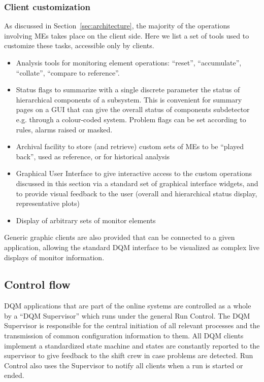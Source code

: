 \documentclass[a4paper]{cmspaper}
\begin{document}
\subsubsection{Client customization}
\label{sec:dqm:tools}
%
As discussed in Section~\ref{sec:architecture}, the majority of the operations
involving MEs takes place on the client side. Here we list
a set of tools used to customize these tasks, accessible only by
clients.
\begin{itemize}
\item{Analysis tools for monitoring element operations:
``reset'', ``accumulate'', ``collate'', ``compare to reference''.}
\item{Status flags to summarize with a single discrete parameter the status of hierarchical
components of a subsystem. This is convenient for
summary pages on a GUI that can give the overall status of components
subdetector e.g. through a colour-coded system. Problem flags
can be set according to rules, alarms raised or masked.}
%
\item{Archival facility to store (and retrieve) custom sets of MEs to be
``played back'', used as reference, or for historical analysis}
%
\item{Graphical User Interface to give interactive access to
the custom operations discussed in this section via a standard set of
graphical interface widgets, and to provide visual feedback to the user (overall and
hierarchical status display, representative plots)}

\item{Display of arbitrary sets of monitor elements}

\end{itemize}
Generic graphic clients are also provided that can be connected to a
given application, 
allowing the standard DQM interface to be visualized as complex live displays of monitor
information.
%
%
%
\subsection{Control flow}

DQM applications that are part of the online systems are controlled as a
whole by a ``DQM Supervisor'' which runs under the general Run Control.
The DQM Supervisor is responsible for the central initiation of all relevant processes and the
transmission of common configuration information to them. All DQM clients implement a standardized
state machine and states are constantly reported to the supervisor
to give feedback to the shift crew in case problems are detected.
Run Control also uses the Supervisor to notify all clients when a run is started or
ended.
\end{document}
